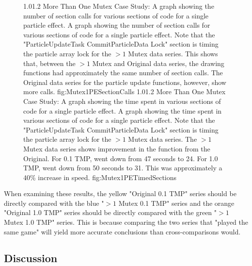 \begin{figure}
\addtocounter{figure}{-1}

	\vspace{-1.5cm}
	{1.0}{1.2}
	{More Than One Mutex Case Study: A graph showing the number of section calls for various sections of code for a single particle effect.}
	{A graph showing the number of section calls for various sections of code for a single particle effect. Note that the "ParticleUpdateTask CommitParticleData Lock" section is timing the particle array lock for the $ > 1$ Mutex data series. This shows that, between the $ > 1$ Mutex and Original data series, the drawing functions had approximately the same number of section calls. The Original data series for the particle update functions, however, show more calls. }
	{fig:Mutex1PESectionCalls}
	\vspace{-1.5cm}
	{1.0}{1.2}
	{More Than One Mutex Case Study: A graph showing the time spent in various sections of code for a single particle effect.}
	{A graph showing the time spent in various sections of code for a single particle effect. Note that the "ParticleUpdateTask CommitParticleData Lock" section is timing the particle array lock for the $ > 1$ Mutex data series. The $ > 1 $ Mutex data series shows improvement in the  function from the Original. For 0.1 TMP,  went down from 47 seconds to 24. For 1.0 TMP,  went down from 50 seconds to 31. This was approximately a 40\% increase in speed. }
	{fig:Mutex1PETimedSections}

\end{figure}

When examining these results\footnotemark, the yellow "Original 0.1 TMP" series should be directly compared with the blue "$>1$ Mutex 0.1 TMP" series and the orange "Original 1.0 TMP" series should be directly compared with the green "$>1$ Mutex 1.0 TMP" series. This is because comparing the two series that "played the same game" will yield more accurate conclusions than cross-comparisons would.


\subsection{Discussion}\label{ssec:studies_mutexes_discussion}

